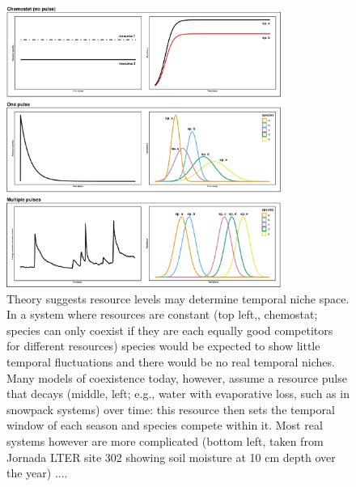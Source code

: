 \documentclass[11pt]{article}
\begin{document}
\begin{figure}[h!]
\centering
\includegraphics[width=0.8\textwidth]{..//figures/JN_conceptfigs/sixpanel_concept.png}
\caption{Theory suggests resource levels may determine temporal niche space. In a system where resources are constant (top left,, chemostat; species can only coexist if they are each equally good competitors for different resources) species would be expected to show little temporal fluctuations and there would be no real temporal niches. Many models of coexistence today, however, assume a resource pulse that decays (middle, left; e.g., water with evaporative loss, such as in snowpack systems) over time: this resource then sets the temporal window of each season and species compete within it. Most real systems however are more complicated (bottom left, taken from Jornada LTER site 302 showing soil moisture at 10 cm depth over the year) ....} 
 \label{fig:resource}
\end{figure}
\end{document}
